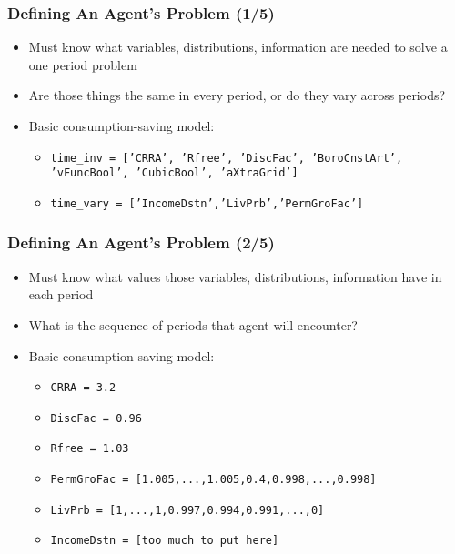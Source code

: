 \documentclass[11ptt]{beamer}
\newcommand{\bi}{\begin{itemize}}
\newcommand{\ei}{\end{itemize}}
\begin{document}
\begin{frame}
\frametitle{Defining An Agent's Problem (1/5)}
\bi
\item <1->Must know what variables, distributions, information are needed to solve a one period problem

  \pause
\item <1->Are those things the same in every period, or do they vary across periods?

\item <2->Basic consumption-saving model:
\bi
\item \texttt{time\_inv = ['CRRA', 'Rfree', 'DiscFac', 'BoroCnstArt', 'vFuncBool', 'CubicBool', 'aXtraGrid']}

\item \texttt{time\_vary = ['IncomeDstn','LivPrb','PermGroFac']}
\ei
\ei
\end{frame}




\begin{frame}
\frametitle{Defining An Agent's Problem (2/5)}
\bi
\item <1->Must know what values those variables, distributions, information have in each period

\item <1->What is the sequence of periods that agent will encounter?

\item <2->Basic consumption-saving model:
\bi
\item \texttt{CRRA = 3.2}

\item \texttt{DiscFac = 0.96}

\item \texttt{Rfree = 1.03}

\item \texttt{PermGroFac = [1.005,...,1.005,0.4,0.998,...,0.998]}

\item \texttt{LivPrb = [1,...,1,0.997,0.994,0.991,...,0]}

\item \texttt{IncomeDstn = [too much to put here]}
\ei
\ei
\end{frame}
\end{document}
